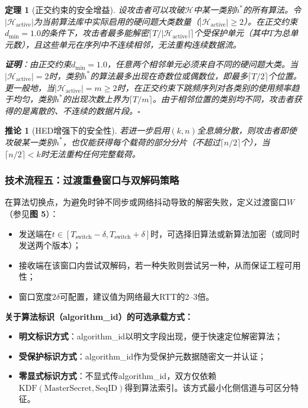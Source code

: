 ﻿\documentclass[12pt,a4paper]{article}
\newtheorem{theorem}{定理}
\newtheorem{corollary}{推论}
\begin{document}
\begin{theorem}[正交约束的安全增益]
设攻击者可以攻破$\mathcal{H}$中某一类别$h^*$的所有算法。令$|\mathcal{H}_{\text{active}}|$为当前算法库中实际启用的硬问题大类数量（$|\mathcal{H}_{\text{active}}| \geq 2$）。在正交约束$d_{\min} = 1.0$的条件下，攻击者最多能解密$\lceil T / |\mathcal{H}_{\text{active}}| \rceil$个受保护单元（其中$T$为总单元数），且这些单元在序列中不连续相邻，无法重构连续数据流。

\textbf{证明}：由正交约束$d_{\min} = 1.0$，任意两个相邻单元必须来自不同的硬问题大类。当$|\mathcal{H}_{\text{active}}| = 2$时，类别$h^*$的算法最多出现在奇数位或偶数位，即最多$\lceil T / 2 \rceil$个位置。更一般地，当$|\mathcal{H}_{\text{active}}| = m \geq 2$时，在正交约束下跳频序列对各类别的使用频率趋于均匀，类别$h^*$的出现次数上界为$\lceil T / m \rceil$。由于相邻位置的类别均不同，攻击者获得的是离散的、不连续的数据片段。$\square$
\end{theorem}

\begin{corollary}[HED增强下的安全性]
若进一步启用$(k,n)$全息熵分散，则攻击者即使攻破某一类别$h^*$，也仅能获得每个载荷的部分分片（不超过$\lceil n/2 \rceil$个），当$\lceil n/2 \rceil < k$时无法重构任何完整载荷。
\end{corollary}

\subsubsection{技术流程五：过渡重叠窗口与双解码策略}

在算法切换点，为避免时钟不同步或网络抖动导致的解密失败，定义过渡窗口$W$（参见\textbf{图 5}）：

\begin{itemize}
    \item 发送端在$t \in [T_{\text{switch}}-\delta, T_{\text{switch}}+\delta]$时，可选择旧算法或新算法加密（或同时发送两个版本）；
    \item 接收端在该窗口内尝试双解码，若一种失败则尝试另一种，从而保证工程可用性；
    \item 窗口宽度$2\delta$可配置，建议值为网络最大RTT的2--3倍。
\end{itemize}

\textbf{关于算法标识（algorithm\_id）的可选承载方式：}
\begin{itemize}
    \item \textbf{明文标识方式}：algorithm\_id以明文字段出现，便于快速定位解密算法；
    \item \textbf{受保护标识方式}：algorithm\_id作为受保护元数据随密文一并认证；
    \item \textbf{零显式标识方式}：不显式传algorithm\_id，双方仅依赖$\text{KDF}(\text{MasterSecret},\text{SeqID})$得到算法索引。该方式最小化侧信道与可区分特征。
\end{itemize}
\end{document}
